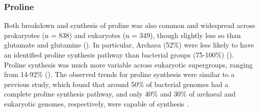\documentclass[utf8]{frontiersSCNS} %
\begin{document}
\subsubsection*{Proline}
Both breakdown and synthesis of proline was also common and widespread across prokaryotes (n = 838) and eukaryotes (n = 349), though slightly less so than glutamate and glutamine (). In particular, Archaea (52\%) were less likely to have an identified proline synthesis pathway than bacterial groups (75-100\%) (). Proline synthesis was much more variable across eukaryotic supergroups, ranging from 14-92\% (). The observed trends for proline synthesis were similar to a previous study, which found that around 50\% of bacterial genomes had a complete proline synthesis pathway, and only 40\% and 30\% of archaeal and eukaryotic genomes, respectively, were capable of synthesis \citep{Mee2012}. 
\end{document}
